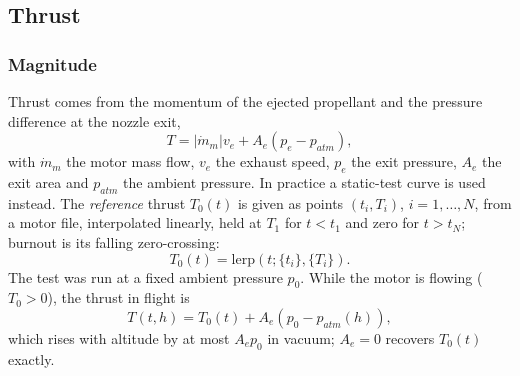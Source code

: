 \subsection{Thrust}\label{sec:thrust}
\subsubsection{Magnitude}
Thrust comes from the momentum of the ejected propellant and the pressure difference at the
nozzle exit,
\begin{equation}
    T = \left|\dot m_m\right| v_e + A_e(p_e - p_{atm}),
\end{equation}
with $\dot m_m$ the motor mass flow, $v_e$ the exhaust speed, $p_e$ the exit pressure, $A_e$ the exit
area and $p_{atm}$ the ambient pressure. In practice a static-test curve is used instead. The
\emph{reference} thrust $T_0(t)$ is given as points $(t_i,T_i)$, $i=1,\dots,N$, from a motor file,
interpolated linearly, held at $T_1$ for $t<t_1$ and zero for $t>t_N$; burnout is its falling
zero-crossing:
\begin{equation}
    T_0(t) = \mathrm{lerp}\!\left(t; \{t_i\}, \{T_i\}\right).
\end{equation}
The test was run at a fixed ambient pressure $p_0$. While the motor is flowing ($T_0>0$), the
thrust in flight is
\begin{equation}\label{eq:thrust_pressure}
    T(t, h) = T_0(t) + A_e\left(p_0 - p_{atm}(h)\right),
\end{equation}
which rises with altitude by at most $A_ep_0$ in vacuum; $A_e=0$ recovers $T_0(t)$ exactly.

